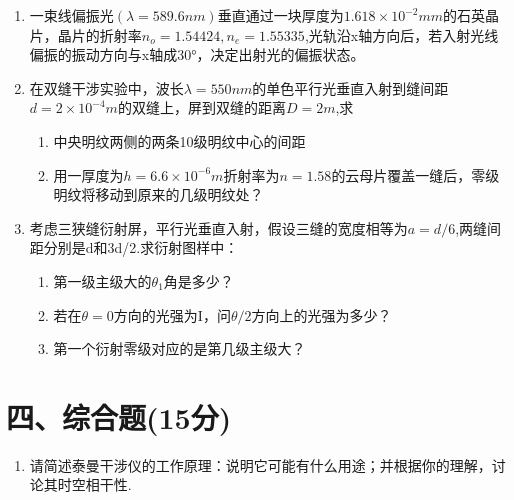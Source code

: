 \documentclass[12pt, a4paper]{article}
\theoremstyle{solution}
\begin{document}
\begin{enumerate}
    \item 一束线偏振光$(\lambda=589.6nm)$垂直通过一块厚度为$1.618×10^{-2}mm$的石英晶片，晶片的折射率$n_o=1.54424,n_e=1.55335$,光轨沿x轴方向后，若入射光线偏振的振动方向与x轴成30°，决定出射光的偏振状态。
    \item 在双缝干涉实验中，波长$\lambda=550nm$的单色平行光垂直入射到缝间距$d=2×10^{-4}m$的双缝上，屏到双缝的距离$D=2m$,求
    \begin{enumerate}
         \item 中央明纹两侧的两条10级明纹中心的间距
         \item 用一厚度为$h=6.6×10^{-6}m$折射率为$n=1.58$的云母片覆盖一缝后，零级明纹将移动到原来的几级明纹处？
    \end{enumerate}
    \item 考虑三狭缝衍射屏，平行光垂直入射，假设三缝的宽度相等为$a=d/6$,两缝间距分别是d和3d/2.求衍射图样中：
    \begin{enumerate}
         \item 第一级主级大的\(\theta_1\)角是多少？
         \item 若在\(\theta=0\)方向的光强为I，问\(\theta/2\)方向上的光强为多少？
         \item 第一个衍射零级对应的是第几级主级大？
    \end{enumerate}
\end{enumerate}
\section*{四、综合题(15分)}
\begin{enumerate}
    \item 请简述泰曼干涉仪的工作原理：说明它可能有什么用途；并根据你的理解，讨论其时空相干性.
\end{enumerate}
\end{document}
